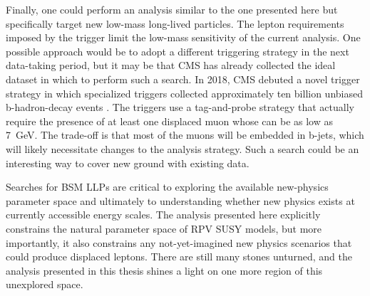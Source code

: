 Finally, one could perform an analysis similar to the one presented here but specifically target new low-mass long-lived particles. The lepton \pt requirements imposed by the trigger limit the low-mass sensitivity of the current analysis. One possible approach would be to adopt a different triggering strategy in the next data-taking period, but it may be that CMS has already collected the ideal dataset in which to perform such a search. In 2018, CMS debuted a novel trigger strategy in which specialized triggers collected approximately ten billion unbiased b-hadron-decay events \cite{cms_b_parking}. The triggers use a tag-and-probe strategy that actually require the presence of at least one displaced muon whose \pt can be as low as \SI{7}{\GeV}. The trade-off is that most of the muons will be embedded in b-jets, which will likely necessitate changes to the analysis strategy. Such a search could be an interesting way to cover new ground with existing data.

Searches for BSM LLPs are critical to exploring the available new-physics parameter space and ultimately to understanding whether new physics exists at currently accessible energy scales. The analysis presented here explicitly constrains the natural parameter space of RPV SUSY models, but more importantly, it also constrains any not-yet-imagined new physics scenarios that could produce displaced leptons. There are still many stones unturned, and the analysis presented in this thesis shines a light on one more region of this unexplored space.

\pagebreak